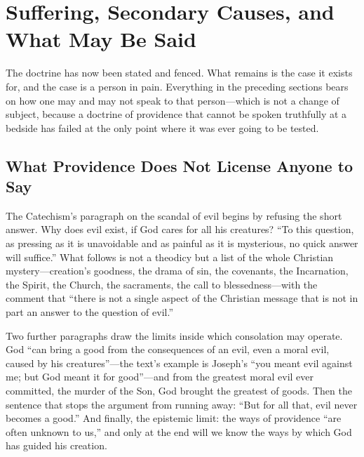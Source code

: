 \section{Suffering, Secondary Causes, and What May Be Said}

The doctrine has now been stated and fenced. What remains is the case it exists for, and the case is a person in pain. Everything in the preceding sections bears on how one may and may not speak to that person---which is not a change of subject, because a doctrine of providence that cannot be spoken truthfully at a bedside has failed at the only point where it was ever going to be tested.

\subsection{What Providence Does Not License Anyone to Say}

The Catechism's paragraph on the scandal of evil begins by refusing the short answer. Why does evil exist, if God cares for all his creatures? ``To this question, as pressing as it is unavoidable and as painful as it is mysterious, no quick answer will suffice.'' What follows is not a theodicy but a list of the whole Christian mystery---creation's goodness, the drama of sin, the covenants, the Incarnation, the Spirit, the Church, the sacraments, the call to blessedness---with the comment that ``there is not a single aspect of the Christian message that is not in part an answer to the question of evil.''

Two further paragraphs draw the limits inside which consolation may operate. God ``can bring a good from the consequences of an evil, even a moral evil, caused by his creatures''---the text's example is Joseph's ``you meant evil against me; but God meant it for good''---and from the greatest moral evil ever committed, the murder of the Son, God brought the greatest of goods. Then the sentence that stops the argument from running away: ``But for all that, evil never becomes a good.'' And finally, the epistemic limit: the ways of providence ``are often unknown to us,'' and only at the end will we know the ways by which God has guided his creation.

